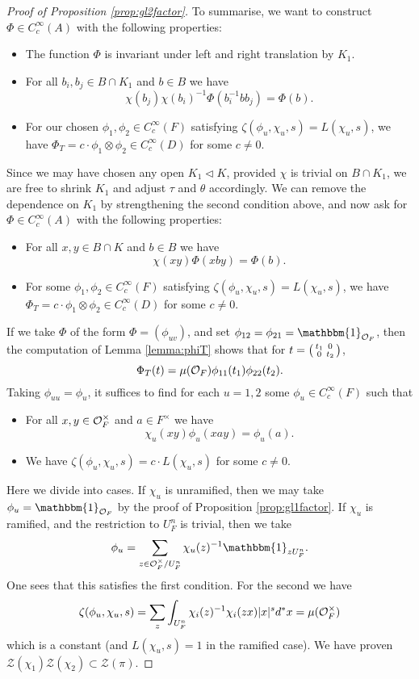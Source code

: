 \begin{proof}[Proof of Proposition \ref{prop:gl2factor}]
    To summarise, we want to construct $\Phi \in C_c^\infty(A)$ with the following properties:
    \begin{itemize}
        \item The function $\Phi$ is invariant under left and right translation by $K_1$.
        \item For all $b_i,b_j \in B \cap K_1$ and $b \in B$ we have $$\chi(b_j)\chi(b_i)^{-1}\Phi(b_i^{-1}bb_j) = \Phi(b).$$
        \item For our chosen $\phi_1,\phi_2 \in C_c^\infty(F)$ satisfying $\zeta(\phi_u,\chi_u,s)=L(\chi_u,s)$, we have $\Phi_T = c \cdot \phi_1 \otimes \phi_2 \in C_c^\infty(D)$ for some $c \neq 0$.
    \end{itemize}
    Since we may have chosen any open $K_1 \lhd K$, provided $\chi$ is trivial on $B \cap K_1$, we are free to shrink $K_1$ and adjust $\tau$ and $\theta$ accordingly. We can remove the dependence on $K_1$ by strengthening the second condition above, and now ask for $\Phi \in C_c^\infty(A)$ with the following properties:
    \begin{itemize}
        \item For all $x,y \in B \cap K$ and $b \in B$ we have $$\chi(xy)\Phi(xby) = \Phi(b).$$
        \item For some $\phi_1,\phi_2 \in C_c^\infty(F)$ satisfying $\zeta(\phi_u,\chi_u,s)=L(\chi_u,s)$, we have $\Phi_T = c \cdot \phi_1 \otimes \phi_2 \in C_c^\infty(D)$ for some $c \neq 0$.
    \end{itemize}
    If we take $\Phi$ of the form $\Phi=(\phi_{uv})$, and set $\phi_{12}=\phi_{21}=\mathbbm{1}_{\mathcal O_F}$, then the computation of Lemma \ref{lemma:phiT} shows that for $t= \begin{psmallmatrix}
        t_1&0\\0&t_2
    \end{psmallmatrix}$,
    $$\Phi_T(t) = \mu(\mathcal{O}_F)\phi_{11}(t_1)\phi_{22}(t_2).$$
    Taking $\phi_{uu}=\phi_u$, it suffices to find for each $u=1,2$ some $\phi_u \in C_c^\infty(F)$ such that
    \begin{itemize}
        \item For all $x,y \in \mathcal{O}_F^\times$ and $a \in F^\times$ we have $$\chi_u(xy)\phi_u(xay) = \phi_u(a).$$
        \item We have $\zeta(\phi_u,\chi_u,s)=c \cdot L(\chi_u,s)$ for some $c \neq 0$.
    \end{itemize}
    Here we divide into cases. If $\chi_u$ is unramified, then we may take $\phi_u = \mathbbm{1}_{\cO_F}$ by the proof of Proposition \ref{prop:gl1factor}. If $\chi_u$ is ramified, and the restriction to $U_F^n$ is trivial, then we take 
    $$ \phi_u = \sum\limits_{z \in \cO_F^\times/U_F^n} \chi_u(z)^{-1} \mathbbm{1}_{zU_F^n}.$$ One sees that this satisfies the first condition. For the second we have 
    $$\zeta(\phi_u,\chi_u,s) = \sum\limits_z \int_{U_F^n} \chi_i(z)^{-1}\chi_i(zx)|x|^s d^*x = \mu(\mathcal{O}_F^\times)$$ which is a constant (and $L(\chi_u,s)=1$ in the ramified case). We have proven $\mathcal Z(\chi_1)\mathcal Z(\chi_2) \subset \mathcal Z(\pi)$.

\end{proof}

